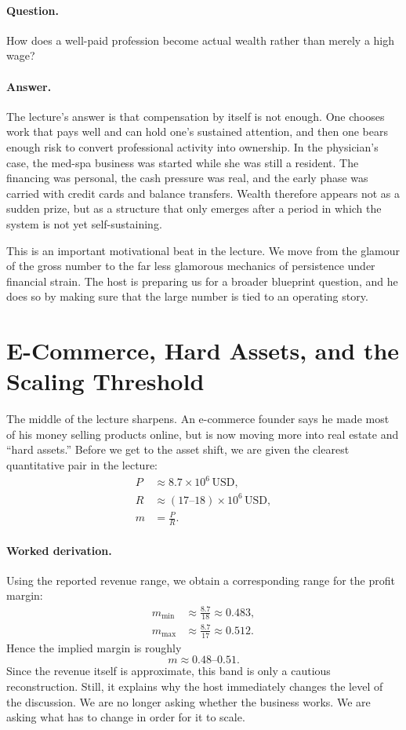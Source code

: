 \paragraph{Question.} How does a well-paid profession become actual wealth rather than merely a high wage?

\paragraph{Answer.} The lecture's answer is that compensation by itself is not enough. One chooses work that pays well and can hold one's sustained attention, and then one bears enough risk to convert professional activity into ownership. In the physician's case, the med-spa business was started while she was still a resident. The financing was personal, the cash pressure was real, and the early phase was carried with credit cards and balance transfers. Wealth therefore appears not as a sudden prize, but as a structure that only emerges after a period in which the system is not yet self-sustaining.

This is an important motivational beat in the lecture. We move from the glamour of the gross number to the far less glamorous mechanics of persistence under financial strain. The host is preparing us for a broader blueprint question, and he does so by making sure that the large number is tied to an operating story.

\section{E-Commerce, Hard Assets, and the Scaling Threshold}

The middle of the lecture sharpens. An e-commerce founder says he made most of his money selling products online, but is now moving more into real estate and ``hard assets.'' Before we get to the asset shift, we are given the clearest quantitative pair in the lecture:
\begin{align}
P &\approx 8.7 \times 10^6\,\mathrm{USD},\\
R &\approx (17\text{--}18) \times 10^6\,\mathrm{USD},\\
m &= \frac{P}{R}.
\end{align}

\paragraph{Worked derivation.}
Using the reported revenue range, we obtain a corresponding range for the profit margin:
\begin{align}
m_{\min} &\approx \frac{8.7}{18} \approx 0.483,\\
m_{\max} &\approx \frac{8.7}{17} \approx 0.512.
\end{align}
Hence the implied margin is roughly
\begin{equation}
m \approx 0.48\text{--}0.51.
\end{equation}
Since the revenue itself is approximate, this band is only a cautious reconstruction. Still, it explains why the host immediately changes the level of the discussion. We are no longer asking whether the business works. We are asking what has to change in order for it to scale.

